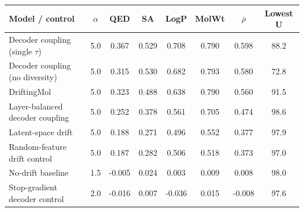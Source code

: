 \begin{tabular}{l c c c c c c c}
\toprule
Model / control & $\alpha$ & QED & SA & LogP & MolWt & $\bar{\rho}$ & Lowest U \\
\midrule
Decoder coupling (single $\tau$) & 5.0 & 0.367 & 0.529 & 0.708 & 0.790 & 0.598 & 88.2 \\
Decoder coupling (no diversity) & 5.0 & 0.315 & 0.530 & 0.682 & 0.793 & 0.580 & 72.8 \\
DriftingMol & 5.0 & 0.323 & 0.488 & 0.638 & 0.790 & 0.560 & 91.5 \\
Layer-balanced decoder coupling & 5.0 & 0.252 & 0.378 & 0.561 & 0.705 & 0.474 & 98.6 \\
\midrule
Latent-space drift & 5.0 & 0.188 & 0.271 & 0.496 & 0.552 & 0.377 & 97.9 \\
Random-feature drift control & 5.0 & 0.187 & 0.282 & 0.506 & 0.518 & 0.373 & 97.0 \\
\midrule
No-drift baseline & 1.5 & -0.005 & 0.024 & 0.003 & 0.009 & 0.008 & 98.0 \\
Stop-gradient decoder control & 2.0 & -0.016 & 0.007 & -0.036 & 0.015 & -0.008 & 97.6 \\
\bottomrule
\end{tabular}
